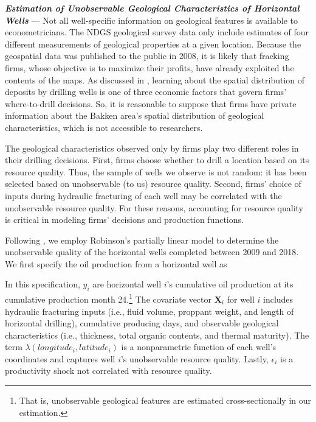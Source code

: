 \textit{\textbf{Estimation of Unobservable Geological Characteristics of Horizontal Wells}} --- Not all well-specific information on geological features is available to econometricians. The NDGS geological survey data only include estimates of four different measurements of geological properties at a given location. Because the geospatial data was published to the public in 2008, it is likely that fracking firms, whose objective is to maximize their profits, have already exploited the contents of the maps. As discussed in \cite{Learning-where-to-drill_Agerton_2020}, learning about the spatial distribution of deposits by drilling wells is one of three economic factors that govern firms' where-to-drill decisions. So, it is reasonable to suppose that firms have private information about the Bakken area's spatial distribution of geological characteristics, which is not accessible to researchers. 

The geological characteristics observed only by firms play two different roles in their drilling decisions. First, firms choose whether to drill a location based on its resource quality. Thus, the sample of wells we observe is not random: it has been selected based on unobservable (to us) resource quality. Second, firms' choice of inputs during hydraulic fracturing of each well may be correlated with the unobservable resource quality. For these reasons, accounting for resource quality is critical in modeling firms' decisions and production functions. 

Following \cite{The-Economics-of-Time-Limited-Development-Options_2020_Herrnstadt-Kellogg-and-Lewis}, we employ Robinson's partially linear model to determine the unobservable quality of the horizontal wells completed between 2009 and 2018. We first specify the oil production from a horizontal well as

In this specification, $y_{i}$ are horizontal well $i$'s cumulative oil production at its cumulative production month 24.\footnote{That is, unobservable geological features are estimated cross-sectionally in our estimation.} The covariate vector $\boldsymbol{X}_{i}$ for well $i$ includes hydraulic fracturing inputs (i.e., fluid volume, proppant weight, and length of horizontal drilling), cumulative producing days, and observable geological characteristics (i.e., thickness, total organic contents, and thermal maturity). The term $\lambda(longitude_{i}, latitude_{i})$ is a nonparametric function of each well's coordinates and captures well $i$'s unobservable resource quality. Lastly, $\epsilon_{i}$ is a productivity shock not correlated with resource quality. 

